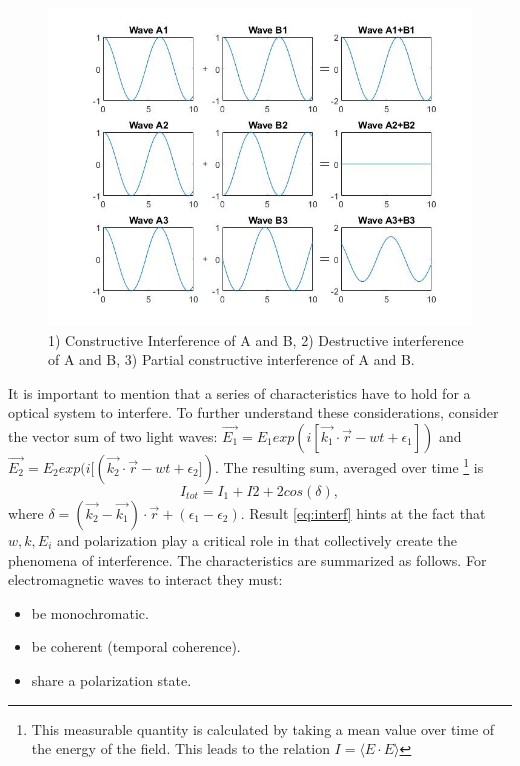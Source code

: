 \begin{figure}[H]
    \centering
    \includegraphics[scale=0.30]{Figures/Figures_I/Basic_Interference.jpg}
    \caption{1) Constructive Interference of A and B, 2) Destructive interference of A and B, 3) Partial constructive interference of A and B. }
    \label{fig:BasicInterf}
\end{figure}

It is important to mention that a series of characteristics have to hold for a optical system to interfere. To further understand these considerations, consider the vector sum of two light waves:  $\Vec{E_1}=E_1 exp(i[\vec{k_1}\cdot \vec{r}-wt+\epsilon_1])$ and $\Vec{E_2}=E_2 exp(i[(\vec{k_2}\cdot \vec{r}-wt+\epsilon_2])$. The resulting sum, averaged over time \footnote{This measurable quantity is calculated by taking a mean value over time of the energy of the field. This leads to the relation $I = \langle E \cdot E \rangle$} is
\begin{equation}
    I_{tot} = I_1 + I2 + 2 cos(\delta),
    \label{eq:interf}
\end{equation}
where $\delta = (\vec{k_2}-\vec{k_1})\cdot \vec{r} + (\epsilon_1-\epsilon_2)$. Result \ref{eq:interf} hints at the fact that $w, k, E_i$ and polarization play a critical role in that collectively create the phenomena of interference. The characteristics are summarized as follows. For electromagnetic waves to interact they must: 
\begin{itemize}
    \item be monochromatic.
    \item be coherent (temporal coherence). 
    \item share a polarization state.
\end{itemize}

